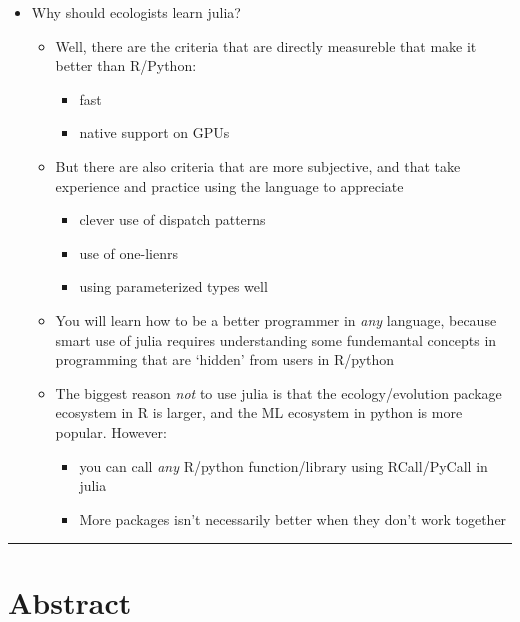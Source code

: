 \documentclass[10pt,oneside]{article}
\begin{document}
\begin{itemize}
\tightlist
\item
  Why should ecologists learn julia?

  \begin{itemize}
  \tightlist
  \item
    Well, there are the criteria that are directly measureble that make
    it better than R/Python:

    \begin{itemize}
    \tightlist
    \item
      fast
    \item
      native support on GPUs
    \end{itemize}
  \item
    But there are also criteria that are more subjective, and that take
    experience and practice using the language to appreciate

    \begin{itemize}
    \tightlist
    \item
      clever use of dispatch patterns
    \item
      use of one-lienrs
    \item
      using parameterized types well
    \end{itemize}
  \item
    You will learn how to be a better programmer in \emph{any} language,
    because smart use of julia requires understanding some fundemantal
    concepts in programming that are `hidden' from users in R/python
  \item
    The biggest reason \emph{not} to use julia is that the
    ecology/evolution package ecosystem in R is larger, and the ML
    ecosystem in python is more popular. However:

    \begin{itemize}
    \tightlist
    \item
      you can call \emph{any} R/python function/library using
      RCall/PyCall in julia
    \item
      More packages isn't necessarily better when they don't work
      together
    \end{itemize}
  \end{itemize}
\end{itemize}

\begin{center}\rule{0.5\linewidth}{0.5pt}\end{center}

\hypertarget{abstract}{%
\section{Abstract}\label{abstract}}
\end{document}
